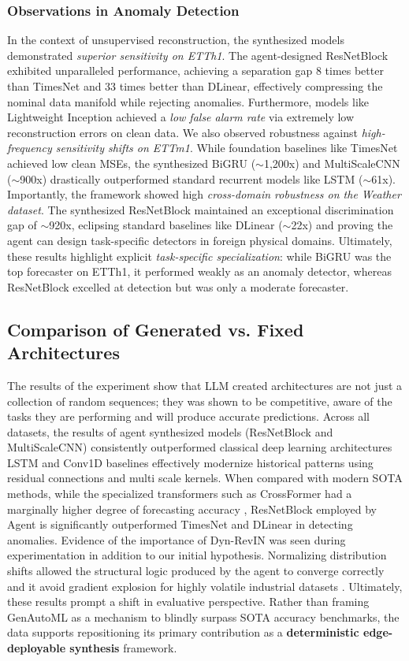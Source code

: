 \documentclass{article}
\begin{document}
\subsubsection{Observations in Anomaly Detection}
In the context of unsupervised reconstruction, the synthesized models demonstrated \textit{superior sensitivity on ETTh1}. The agent-designed ResNetBlock exhibited unparalleled performance, achieving a separation gap 8 times better than TimesNet and 33 times better than DLinear, effectively compressing the nominal data manifold while rejecting anomalies. Furthermore, models like Lightweight Inception achieved a \textit{low false alarm rate} via extremely low reconstruction errors on clean data. We also observed robustness against \textit{high-frequency sensitivity shifts on ETTm1}. While foundation baselines like TimesNet achieved low clean MSEs, the synthesized BiGRU ($\sim$1,200x) and MultiScaleCNN ($\sim$900x) drastically outperformed standard recurrent models like LSTM ($\sim$61x). Importantly, the framework showed high \textit{cross-domain robustness on the Weather dataset}. The synthesized ResNetBlock maintained an exceptional discrimination gap of $\sim$920x, eclipsing standard baselines like DLinear ($\sim$22x) and proving the agent can design task-specific detectors in foreign physical domains. Ultimately, these results highlight explicit \textit{task-specific specialization}: while BiGRU was the top forecaster on ETTh1, it performed weakly as an anomaly detector, whereas ResNetBlock excelled at detection but was only a moderate forecaster.


\subsection{Comparison of Generated vs. Fixed Architectures}
The results of the experiment show that LLM created architectures are not just a collection of random sequences; they was shown to be competitive, aware of the tasks they are performing and will produce accurate predictions. Across all datasets, the results of agent synthesized models (ResNetBlock and MultiScaleCNN) consistently outperformed classical deep learning architectures LSTM and Conv1D baselines effectively modernize historical patterns using residual connections and multi scale kernels. When compared with modern SOTA methods, while the specialized transformers such as CrossFormer had a marginally higher degree of forecasting accuracy \cite{he2016}, ResNetBlock employed by Agent is significantly outperformed TimesNet and DLinear in detecting anomalies. Evidence of the importance of Dyn-RevIN was seen during experimentation in addition to our initial hypothesis. Normalizing distribution shifts allowed the structural logic produced by the agent to converge correctly and it avoid gradient explosion for highly volatile industrial datasets \cite{pascanu2013difficulty}. Ultimately, these results prompt a shift in evaluative perspective. Rather than framing GenAutoML as a mechanism to blindly surpass SOTA accuracy benchmarks, the data supports repositioning its primary contribution as a \textbf{deterministic edge-deployable synthesis} framework.
 
\end{document}
